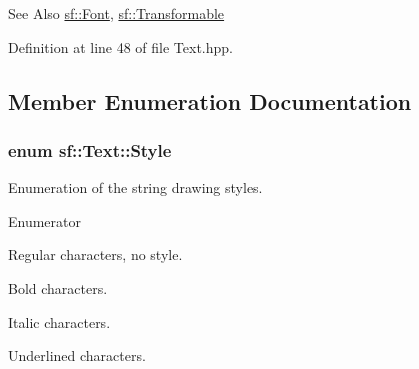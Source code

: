\begin{DoxySeeAlso}{See Also}
\hyperlink{classsf_1_1_font}{sf\-::\-Font}, \hyperlink{classsf_1_1_transformable}{sf\-::\-Transformable} 
\end{DoxySeeAlso}


Definition at line 48 of file Text.\-hpp.



\subsection{Member Enumeration Documentation}
\hypertarget{classsf_1_1_text_aa8add4aef484c6e6b20faff07452bd82}{
\subsubsection[{Style}]{\setlength{\rightskip}{0pt plus 5cm}enum {\bf sf\-::\-Text\-::\-Style}}}\label{classsf_1_1_text_aa8add4aef484c6e6b20faff07452bd82}


Enumeration of the string drawing styles. 

\begin{Desc}
\item[Enumerator]\par
\begin{description}
\item[{\em 
\hypertarget{classsf_1_1_text_aa8add4aef484c6e6b20faff07452bd82a2af9ae5e1cda126570f744448e0caa32}{Regular}\label{classsf_1_1_text_aa8add4aef484c6e6b20faff07452bd82a2af9ae5e1cda126570f744448e0caa32}
}]Regular characters, no style. \item[{\em 
\hypertarget{classsf_1_1_text_aa8add4aef484c6e6b20faff07452bd82af1b47f98fb1e10509ba930a596987171}{Bold}\label{classsf_1_1_text_aa8add4aef484c6e6b20faff07452bd82af1b47f98fb1e10509ba930a596987171}
}]Bold characters. \item[{\em 
\hypertarget{classsf_1_1_text_aa8add4aef484c6e6b20faff07452bd82aee249eb803848723c542c2062ebe69d8}{Italic}\label{classsf_1_1_text_aa8add4aef484c6e6b20faff07452bd82aee249eb803848723c542c2062ebe69d8}
}]Italic characters. \item[{\em 
\hypertarget{classsf_1_1_text_aa8add4aef484c6e6b20faff07452bd82a664bd143f92b6e8c709d7f788e8b20df}{Underlined}\label{classsf_1_1_text_aa8add4aef484c6e6b20faff07452bd82a664bd143f92b6e8c709d7f788e8b20df}
}]Underlined characters. \end{description}
\end{Desc}


